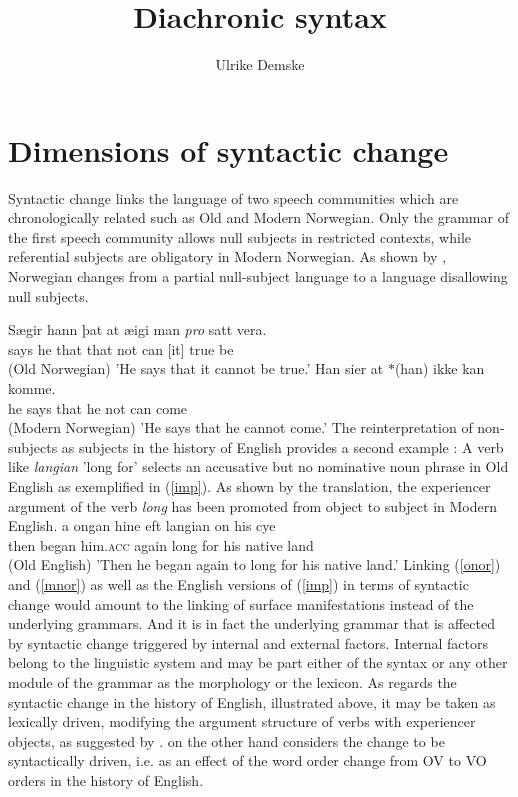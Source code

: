 \documentclass[output=paper]{langsci/langscibook}
\author{Ulrike Demske\affiliation{Universität Potsdam}}
\title{Diachronic syntax}
\begin{document}
\label{chap-diachronic}


\section{Dimensions of syntactic change} 

Syntactic change links the language of two speech communities which are chronologically related such as Old  and Modern Norwegian. Only the grammar of the first speech community allows null subjects in restricted contexts, while referential subjects are obligatory in Modern Norwegian. As shown by \cite{kinn2015}, Norwegian changes from a partial null-subject language to a language disallowing null subjects.

\eal 
\ex \label{onor}
\gll Sægir hann þat  at   æigi  man \textit{pro} satt vera.\\ 
     says  he   that that not   can [it] true be \\\hfill(Old Norwegian)
\glt 'He says that it cannot be true.'  
\ex \label{mnor}
\gll Han sier at $*$(han) ikke kan komme.\\ 
     he says that he not can come \\ \hfill (Modern Norwegian) 
\glt 'He says that he cannot come.' 
\zl
The reinterpretation of non-subjects as subjects in the history of English provides a second example \citep{denison1993}: A verb like \textit{langian} 'long for' selects an accusative but no nominative noun phrase in Old English as exemplified in (\ref{imp}). As shown by the translation, the experiencer argument of the verb \textit{long} has been promoted from object to subject in Modern English. 
\ea \label{imp}
\gll \th a ongan hine eft langian on his cy\th \th e  \\ then began him.\textsc{acc} again long for his {native land} \\ \hfill (Old English)
\glt 'Then he began again to long for his native land.' 
\z
Linking (\ref{onor}) and (\ref{mnor}) as well as the English versions of (\ref{imp}) in terms of syntactic change would amount to the linking of surface manifestations instead of the underlying grammars. And it is in fact the underlying grammar that is affected by syntactic change triggered by internal and external factors. Internal factors belong to the linguistic system and may be part either of the syntax or any other module of the grammar as the morphology or the lexicon. As regards the syntactic change in the history of English, illustrated above, it may be taken as lexically driven, modifying the argument structure of verbs with experiencer objects, as suggested by \citep{denison1993}. \cite{lightfoot1979} on the other hand considers the change to be syntactically driven, i.e. as an effect of the word order change from OV to VO orders in the history of English. 
\end{document}
